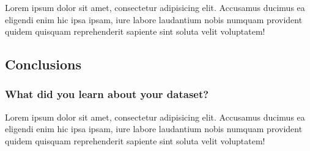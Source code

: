 Lorem ipsum dolor sit amet, consectetur adipisicing elit. Accusamus ducimus ea eligendi enim hic ipsa ipsam, iure labore laudantium nobis numquam provident quidem quisquam reprehenderit sapiente sint soluta velit voluptatem!

\subsection{Conclusions}

\subsubsection{What did you learn about your dataset?}

Lorem ipsum dolor sit amet, consectetur adipisicing elit. Accusamus ducimus ea eligendi enim hic ipsa ipsam, iure labore laudantium nobis numquam provident quidem quisquam reprehenderit sapiente sint soluta velit voluptatem!
